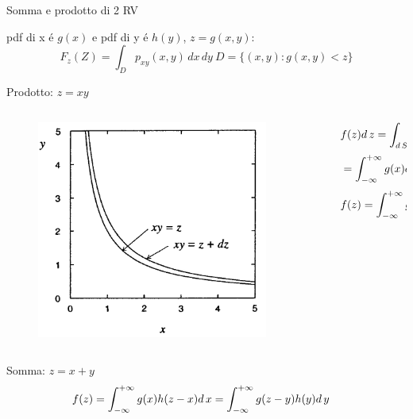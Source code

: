 \documentclass[asd-beamer.tex]{subfiles}%
\begin{document}
\begin{frame}{Somma e prodotto di 2 RV}
\begin{block}{}
pdf di x \'e $g(x)$ e pdf di y \'e $h(y)$, $z=g(x,y)$:
\[F_z(Z)=\int_Dp_{xy}(x,y)\,dx\,dy\ D=\{(x,y):g(x,y)<z\}\]
\end{block}
\begin{block}{Prodotto: $z=xy$}
	\begin{columns}[T]
		\begin{column}{0.3\textwidth}
			\begin{figure}
				\centering
				\includegraphics[keepaspectratio,width=0.9\textwidth]{figures/cowan/probability/RVprod}
				\label{fig:RVprod}
			\end{figure}
		\end{column}
		\begin{column}{0.7\textwidth}
			\begin{align*}
			&f(z)d\,z=\int_{d\,S}g(x)h(y)d\,xd\,y\\
			&=\int_{-\infty}^{+\infty}{}g(x)d\,x\int_{\frac{z}{|x|}}^{\frac{z+d\,s}{|x|}}h(y)d\,y\\
			&f(z)=\int_{-\infty}^{+\infty}{}g(\frac{z}{y})h(y)\frac{d\,y}{|y|}
			\end{align*}
		\end{column}
	\end{columns}
\end{block}
\begin{block}{Somma: $z=x+y$}
	\begin{align*}
	&f(z)=\int_{-\infty}^{+\infty}{}g(x)h(z-x)d\,x=\int_{-\infty}^{+\infty}{}g(z-y)h(y)d\,y
	\end{align*}
\end{block}
\end{frame}
\end{document}
